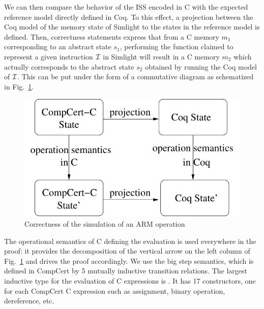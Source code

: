 We can then compare the behavior of the ISS encoded in C 
with the expected reference model directly defined in Coq.
To this effect, a projection between the Coq model of the
memory state of Simlight to the states in the reference model
is defined.
Then, correctness statements express that from a 
C memory $m_1$ corresponding to an abstract state $s_1$,
performing the function claimed to represent a given instruction $\cal I$
in Simlight 
will result in a C memory $m_2$ which actually corresponds 
to the abstract state $s_2$ obtained by
running the Coq model of $\cal I$. 
This can be put under the form of a commutative diagram as
schematized in Fig.~\ref{fig:thrm}.

\begin{figure}
\hfil\includegraphics[width=.5\linewidth]{theorem.pdf}
\caption{Correctness of the simulation of an ARM operation}
\label{fig:thrm}
\end{figure}

The operational semantics of C defining the evaluation is used everywhere 
in the proof: it provides the decomposition of the vertical arrow
on the left column of Fig.~\ref{fig:thrm} 
and drives the proof accordingly. %
%
We use the big step semantics, 
which is defined in CompCert by 5 mutually inductive transition relations.
The largest inductive type for the evaluation of C expressions 
is .
It has 17 constructors, one for each CompCert C expression 
such as assignment, binary operation, dereference, etc.  


